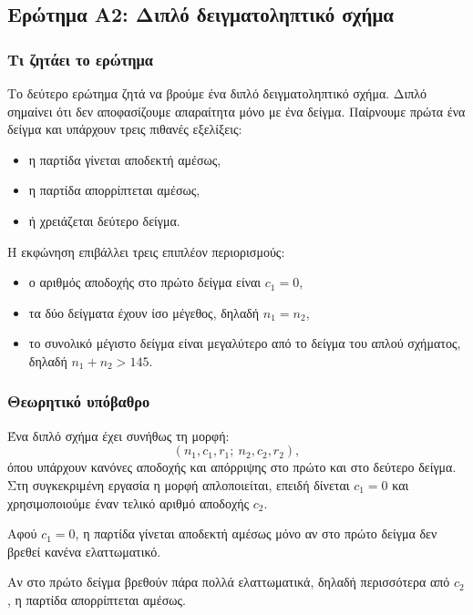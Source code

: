 \documentclass[12pt,a4paper]{article}
\begin{document}
\subsection{Ερώτημα Α2: Διπλό δειγματοληπτικό σχήμα}

\subsubsection*{Τι ζητάει το ερώτημα}

Το δεύτερο ερώτημα ζητά να βρούμε ένα διπλό δειγματοληπτικό σχήμα. Διπλό
σημαίνει ότι δεν αποφασίζουμε απαραίτητα μόνο με ένα δείγμα. Παίρνουμε πρώτα
ένα δείγμα και υπάρχουν τρεις πιθανές εξελίξεις:

\begin{itemize}
    \item η παρτίδα γίνεται αποδεκτή αμέσως,
    \item η παρτίδα απορρίπτεται αμέσως,
    \item ή χρειάζεται δεύτερο δείγμα.
\end{itemize}

Η εκφώνηση επιβάλλει τρεις επιπλέον περιορισμούς:

\begin{itemize}
    \item ο αριθμός αποδοχής στο πρώτο δείγμα είναι \(c_1=0\),
    \item τα δύο δείγματα έχουν ίσο μέγεθος, δηλαδή \(n_1=n_2\),
    \item το συνολικό μέγιστο δείγμα είναι μεγαλύτερο από το δείγμα του απλού
    σχήματος, δηλαδή \(n_1+n_2>145\).
\end{itemize}

\subsubsection*{Θεωρητικό υπόβαθρο}

Ένα διπλό σχήμα έχει συνήθως τη μορφή:
\[
    (n_1,c_1,r_1;\ n_2,c_2,r_2),
\]
όπου υπάρχουν κανόνες αποδοχής και απόρριψης στο πρώτο και στο δεύτερο δείγμα.
Στη συγκεκριμένη εργασία η μορφή απλοποιείται, επειδή δίνεται \(c_1=0\) και
χρησιμοποιούμε έναν τελικό αριθμό αποδοχής \(c_2\).

Αφού \(c_1=0\), η παρτίδα γίνεται αποδεκτή αμέσως μόνο αν στο πρώτο δείγμα δεν
βρεθεί κανένα ελαττωματικό.

Αν στο πρώτο δείγμα βρεθούν πάρα πολλά ελαττωματικά, δηλαδή περισσότερα από
\(c_2\), η παρτίδα απορρίπτεται αμέσως.
\end{document}

